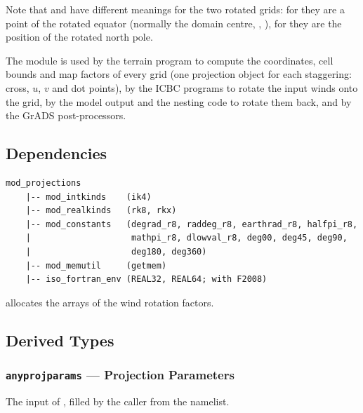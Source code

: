 \noindent Note that  and  have different meanings for
the two rotated grids: for  they are a point of the rotated
equator (normally the domain centre, ,
), for  they are the position of the rotated
north pole.

The module is used by the terrain program to compute the coordinates,
cell bounds and map factors of every grid (one projection object for each
staggering: cross, $u$, $v$ and dot points), by the ICBC programs to rotate
the input winds onto the grid, by the model output and the nesting code to
rotate them back, and by the GrADS post-processors.

\subsection{Dependencies}

\begin{lstlisting}
mod_projections
    |-- mod_intkinds    (ik4)
    |-- mod_realkinds   (rk8, rkx)
    |-- mod_constants   (degrad_r8, raddeg_r8, earthrad_r8, halfpi_r8,
    |                    mathpi_r8, dlowval_r8, deg00, deg45, deg90,
    |                    deg180, deg360)
    |-- mod_memutil     (getmem)
    |-- iso_fortran_env (REAL32, REAL64; with F2008)
\end{lstlisting}

 allocates the arrays of the wind rotation factors.

\subsection{Derived Types}
\label{subsec:proj_types}

\subsubsection{\texttt{anyprojparams} --- Projection Parameters}

The input of , filled by the caller from the namelist.

